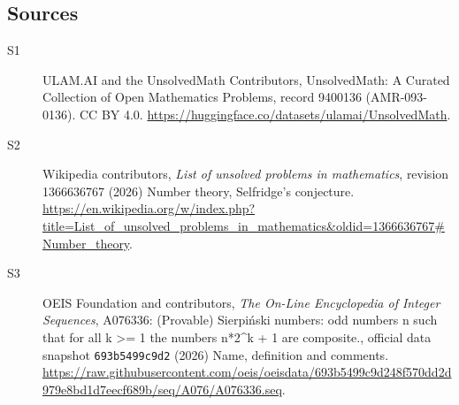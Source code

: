 \documentclass[11pt]{article}
\begin{document}
\subsection{Sources}
\begin{description}
\item[\hypertarget{source:9400136:1}{S1}] ULAM.AI and the UnsolvedMath Contributors, UnsolvedMath: A Curated Collection of Open Mathematics Problems, record 9400136 (AMR-093-0136). CC BY 4.0. \url{https://huggingface.co/datasets/ulamai/UnsolvedMath}.
\item[\hypertarget{source:9400136:2}{S2}] Wikipedia contributors, \emph{List of unsolved problems in mathematics}, revision 1366636767 (2026) Number theory, Selfridge's conjecture. \url{https://en.wikipedia.org/w/index.php?title=List_of_unsolved_problems_in_mathematics&oldid=1366636767#Number_theory}.
\item[\hypertarget{source:9400136:3}{S3}] OEIS Foundation and contributors, \emph{The On-Line Encyclopedia of Integer Sequences}, A076336: (Provable) Sierpiński numbers: odd numbers n such that for all k >= 1 the numbers n*2\textasciicircum{}k + 1 are composite., official data snapshot \texttt{693b5499c9d2} (2026) Name, definition and comments. \url{https://raw.githubusercontent.com/oeis/oeisdata/693b5499c9d248f570dd2d979e8bd1d7eecf689b/seq/A076/A076336.seq}.
\end{description}
\label{end:9400136}
\end{document}
